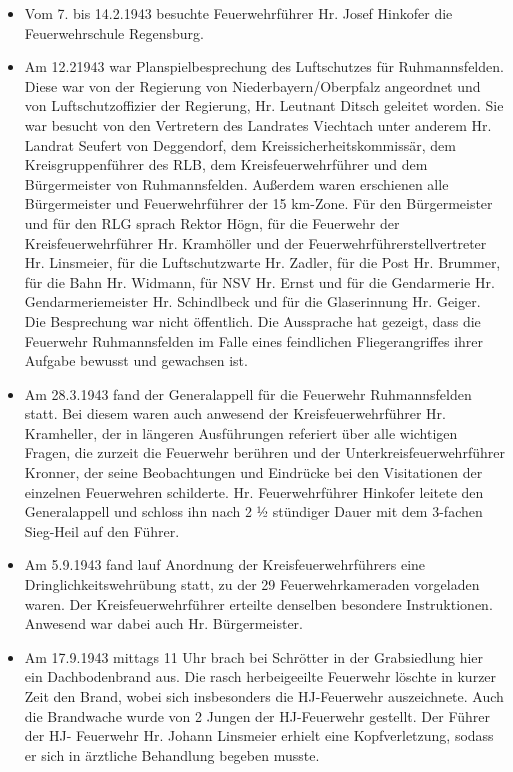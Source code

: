 \documentclass[12pt,a4paper]{book}
\begin{document}
\begin{itemize}
\item Vom 7. bis 14.2.1943 besuchte Feuerwehrführer Hr. Josef Hinkofer die
Feuerwehrschule Regensburg.

\item Am 12.21943 war Planspielbesprechung des Luftschutzes für Ruhmannsfelden.
Diese war von der Regierung von Niederbayern/Oberpfalz angeordnet und von
Luftschutzoffizier der Regierung, Hr. Leutnant Ditsch geleitet worden. Sie war
besucht von den Vertretern des Landrates Viechtach unter anderem Hr. Landrat
Seufert von Deggendorf, dem Kreissicherheitskommissär, dem Kreisgruppenführer
des RLB, dem Kreisfeuerwehrführer und dem Bürgermeister von Ruhmannsfelden.
Außerdem waren erschienen alle Bürgermeister und Feuerwehrführer der 15 km-Zone.
Für den Bürgermeister und für den RLG sprach Rektor Högn, für die Feuerwehr der
Kreisfeuerwehrführer Hr. Kramhöller und der Feuerwehrführerstellvertreter Hr.
Linsmeier, für die Luftschutzwarte Hr. Zadler, für die Post Hr. Brummer, für die
Bahn Hr. Widmann, für NSV Hr. Ernst und für die Gendarmerie Hr.
Gendarmeriemeister Hr. Schindlbeck und für die Glaserinnung Hr. Geiger. Die
Besprechung war nicht öffentlich. Die Aussprache hat gezeigt, dass die Feuerwehr
Ruhmannsfelden im Falle eines feindlichen Fliegerangriffes ihrer Aufgabe bewusst
und gewachsen ist.

\item Am 28.3.1943 fand der Generalappell für die Feuerwehr Ruhmannsfelden
statt. Bei diesem waren auch anwesend der Kreisfeuerwehrführer Hr. Kramheller,
der in längeren Ausführungen referiert über alle wichtigen Fragen, die zurzeit
die Feuerwehr berühren und der Unterkreisfeuerwehrführer Kronner, der seine
Beobachtungen und Eindrücke bei den Visitationen der einzelnen Feuerwehren
schilderte. Hr. Feuerwehrführer Hinkofer leitete den Generalappell und schloss
ihn nach 2 ½ stündiger Dauer mit dem 3-fachen Sieg-Heil auf den Führer.

\item Am 5.9.1943 fand lauf Anordnung der Kreisfeuerwehrführers eine
Dringlichkeitswehrübung statt, zu der 29 Feuerwehrkameraden vorgeladen waren.
Der Kreisfeuerwehrführer erteilte denselben besondere Instruktionen. Anwesend
war dabei auch Hr. Bürgermeister.

\item Am 17.9.1943 mittags 11 Uhr brach bei Schrötter in der Grabsiedlung hier
ein Dachbodenbrand aus. Die rasch herbeigeeilte Feuerwehr löschte in kurzer Zeit
den Brand, wobei sich insbesonders die HJ-Feuerwehr auszeichnete. Auch die
Brandwache wurde von 2 Jungen der HJ-Feuerwehr gestellt. Der Führer der HJ-
Feuerwehr Hr. Johann Linsmeier erhielt eine Kopfverletzung, sodass er sich in
ärztliche Behandlung begeben musste.
\end{itemize}
\end{document}
